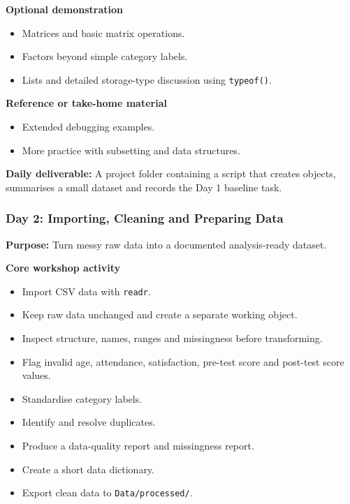\documentclass[11pt]{article}
\providecommand{\tightlist}{%
  \setlength{\itemsep}{0pt}\setlength{\parskip}{0pt}}
\begin{document}
\textbf{Optional demonstration}

\begin{itemize}
\tightlist
\item
  Matrices and basic matrix operations.
\item
  Factors beyond simple category labels.
\item
  Lists and detailed storage-type discussion using \texttt{typeof()}.
\end{itemize}

\textbf{Reference or take-home material}

\begin{itemize}
\tightlist
\item
  Extended debugging examples.
\item
  More practice with subsetting and data structures.
\end{itemize}

\textbf{Daily deliverable:} A project folder containing a script that
creates objects, summarises a small dataset and records the Day 1
baseline task.

\hypertarget{day-2-importing-cleaning-and-preparing-data}{%
\subsubsection{Day 2: Importing, Cleaning and Preparing
Data}\label{day-2-importing-cleaning-and-preparing-data}}

\textbf{Purpose:} Turn messy raw data into a documented analysis-ready
dataset.

\textbf{Core workshop activity}

\begin{itemize}
\tightlist
\item
  Import CSV data with \texttt{readr}.
\item
  Keep raw data unchanged and create a separate working object.
\item
  Inspect structure, names, ranges and missingness before transforming.
\item
  Flag invalid age, attendance, satisfaction, pre-test score and
  post-test score values.
\item
  Standardise category labels.
\item
  Identify and resolve duplicates.
\item
  Produce a data-quality report and missingness report.
\item
  Create a short data dictionary.
\item
  Export clean data to \texttt{Data/processed/}.
\end{itemize}
\end{document}

